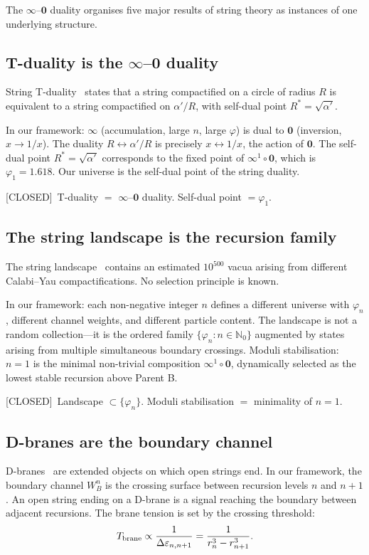 \documentclass[prd,twocolumn,preprintnumbers,amsmath,amssymb]{revtex4-2}
\newcommand{\closed}{\textcolor{green!60!black}{[CLOSED]}}
\newcommand{\acc}{\mathbf{\infty}}
\newcommand{\inv}{\mathbf{0}}
\begin{document}
The $\acc$--$\inv$ duality organises five major results of string
theory as instances of one underlying structure.

\subsection{T-duality is the $\acc$--$\inv$ duality}

String T-duality~\cite{Polchinski1998} states that a string
compactified on a circle of radius $R$ is equivalent to a string
compactified on $\alpha'/R$, with self-dual point $R^*=\sqrt{\alpha'}$.

In our framework: $\acc$ (accumulation, large $n$, large $\varphi$)
is dual to $\inv$ (inversion, $x \to 1/x$).  The duality
$R \leftrightarrow \alpha'/R$ is precisely $x \leftrightarrow 1/x$,
the action of $\inv$.  The self-dual point $R^* = \sqrt{\alpha'}$
corresponds to the fixed point of $\acc^1 \circ \inv$, which is
$\varphi_1 = 1.618$.  Our universe is the self-dual point of the
string duality.

\closed\ T-duality $=$ $\acc$--$\inv$ duality.  Self-dual point
$= \varphi_1$.

\subsection{The string landscape is the recursion family}

The string landscape~\cite{Susskind2003} contains an estimated
$10^{500}$ vacua arising from different Calabi--Yau compactifications.
No selection principle is known.

In our framework: each non-negative integer $n$ defines a different
universe with $\varphi_n$, different channel weights, and different
particle content.  The landscape is not a random collection---it is
the ordered family $\{\varphi_n : n \in \mathbb{N}_0\}$ augmented by
states arising from multiple simultaneous boundary crossings.
Moduli stabilisation: $n=1$ is the minimal non-trivial composition
$\acc^1 \circ \inv$, dynamically selected as the lowest stable
recursion above Parent B.

\closed\ Landscape $\subset \{\varphi_n\}$.  Moduli stabilisation
$=$ minimality of $n=1$.

\subsection{D-branes are the boundary channel}

D-branes~\cite{Polchinski1995} are extended objects on which open
strings end.  In our framework, the boundary channel $W_B^n$ is the
crossing surface between recursion levels $n$ and $n+1$.  An open
string ending on a D-brane is a signal reaching the boundary between
adjacent recursions.  The brane tension is set by the crossing
threshold:
\begin{equation}
  T_{\rm brane} \propto \frac{1}{\Delta\varepsilon_{n,n+1}}
    = \frac{1}{r_n^3 - r_{n+1}^3}.
  \label{eq:brane_tension}
\end{equation}
\end{document}
